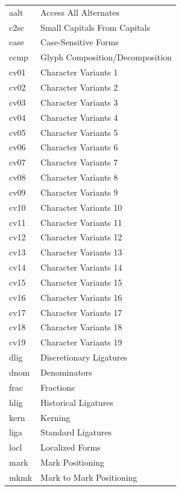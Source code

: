 \documentclass[10pt,a4paper,english]{article}
\begin{document}
\begin{figure}[ht]
	\centering
	\begin{tabular}{>{\ttfamily}l l}
        aalt & Access All Alternates \\
        c2sc & Small Capitals From Capitals \\
        case & Case-Sensitive Forms \\
        ccmp & Glyph Composition/Decomposition \\
        cv01 & Character Variants 1 \\
        cv02 & Character Variants 2 \\
        cv03 & Character Variants 3 \\
        cv04 & Character Variants 4 \\
        cv05 & Character Variants 5 \\
        cv06 & Character Variants 6 \\
        cv07 & Character Variants 7 \\
        cv08 & Character Variants 8 \\
        cv09 & Character Variants 9 \\
        cv10 & Character Variants 10 \\
        cv11 & Character Variants 11 \\
        cv12 & Character Variants 12 \\
        cv13 & Character Variants 13 \\
        cv14 & Character Variants 14 \\
        cv15 & Character Variants 15 \\
        cv16 & Character Variants 16 \\
        cv17 & Character Variants 17 \\
        cv18 & Character Variants 18 \\
        cv19 & Character Variants 19 \\
        dlig & Discretionary Ligatures \\
        dnom & Denominators \\
        frac & Fractions \\
        hlig & Historical Ligatures \\
        kern & Kerning \\
        liga & Standard Ligatures \\
        locl & Localized Forms \\
        mark & Mark Positioning \\
        mkmk & Mark to Mark Positioning \\

\end{tabular}
\end{figure}
\end{document}
